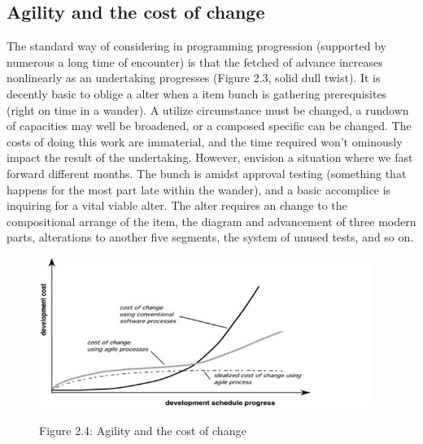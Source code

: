 \documentclass{book}
\begin{document}
    	\subsection{Agility and the cost of change}
    	The standard way of considering in programming progression (supported by numerous a long time of encounter) is that the fetched of advance increases nonlinearly as an undertaking progresses (Figure 2.3, solid dull twist). It is decently basic to oblige a alter when a item bunch is gathering prerequisites (right on time in a wander). A utilize circumstance must be changed, a rundown of capacities may well be broadened, or a composed specific can be changed. The costs of doing this work are immaterial, and the time required won't ominously impact the result of the undertaking. However, envision a situation where we fast forward different months. The bunch is amidst approval testing (something that happens for the most part late within the wander), and a basic accomplice is inquiring for a vital viable alter. The alter requires an change to the compositional arrange of the item, the diagram and advancement of three modern parts, alterations to another five segments, the system of unused tests, and so on.
    	
    	
    	\begin{figure}
    		\includegraphics[]{images/chotu.png}
    		
    		\begin{center}
    				Figure 2.4: Agility and the cost of change
    		\end{center}
    	\end{figure}
\end{document}
